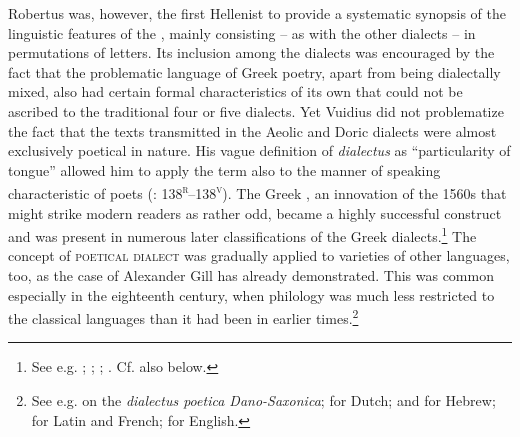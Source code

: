 Robertus \citet[146\textsc{\textsuperscript{v}}–148\textsc{\textsuperscript{v}}]{Vuidius1569} was, however, the first Hellenist to provide a systematic synopsis of the linguistic features of the , mainly consisting – as with the other dialects – in permutations of letters. Its inclusion among the dialects was encouraged by the fact that the problematic language of Greek poetry, apart from being dialectally mixed, also had certain formal characteristics of its own that could not be ascribed to the traditional four or five dialects. Yet Vuidius did not problematize the fact that the texts transmitted in the Aeolic and Doric dialects were almost exclusively poetical in nature. His vague definition of \textit{dialectus} as “particularity of tongue” allowed him to apply the term also to the manner of speaking characteristic of poets (\citealt{Vuidius1569}: 138\textsc{\textsuperscript{r}}–138\textsc{\textsuperscript{v}}). The Greek , an innovation of the 1560s that might strike modern readers as rather odd, became a highly successful construct and was present in numerous later classifications of the Greek dialects.\footnote{See e.g. \citet[\textsc{x}.1\textsc{\textsuperscript{v}}]{Dabercusius1577}; \citet[\textsc{i.1}\textsc{\textsuperscript{v}}]{Camden1595}; \citet[376--377]{Kober1701}; \citet[113]{Petisco1764}. Cf. also  below.} The concept of \textsc{poetical} \textsc{dialect} was gradually applied to varieties of other languages, too, as the case of Alexander Gill has already demonstrated. This was common especially in the eighteenth century, when philology was much less restricted to the classical languages than it had been in earlier times.\footnote{See e.g. \citet[101]{Hickes1705} on the \textit{dialectus poetica Dano-Saxonica}; \citet[*.3\textsc{\textsuperscript{r}}]{Verwer1707} for Dutch; \citet[24]{Wesley1736} and \citet{Vogel1764} for Hebrew; \citet[240, 241]{Beattie1778} for Latin and French; \citet[292]{Macnicol1779} for English.}

